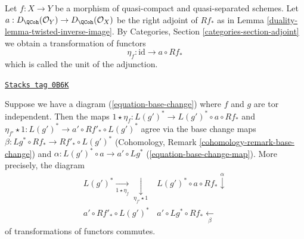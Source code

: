 Let $f : X \to Y$ be a morphism of quasi-compact and quasi-separated
schemes. Let $a : D_\QCoh(\mathcal{O}_Y) \to D_\QCoh(\mathcal{O}_X)$
be the right adjoint of $Rf_*$ as in
Lemma \ref{duality-lemma-twisted-inverse-image}. By
Categories, Section \ref{categories-section-adjoint} we obtain a
transformation of functors
$$
\eta_f : \text{id} \to  a \circ Rf_*
$$
which is called the unit of the adjunction.

\begin{lemma}
\label{duality-lemma-unit-and-base-change}
\href{https://stacks.math.columbia.edu/tag/0B6K}{\texttt{Stacks tag 0B6K}}

Suppose we have a diagram (\ref{equation-base-change}) where $f$ and $g$
are tor independent. Then the maps
$1 \star \eta_f : L(g')^* \to L(g')^* \circ a \circ Rf_*$ and
$\eta_{f'} \star 1 : L(g')^* \to a' \circ Rf'_* \circ L(g')^*$
agree via the base change maps
$\beta : Lg^* \circ Rf_* \to Rf'_* \circ L(g')^*$
(Cohomology, Remark \ref{cohomology-remark-base-change})
and $\alpha : L(g')^* \circ a \to a' \circ Lg^*$
(\ref{equation-base-change-map}).
More precisely, the diagram
$$
\begin{array}{cc}L(g')^* \underset{1 \star \eta_f}{\longrightarrow}\underset{\eta_{f'} \star 1}{\downarrow} & L(g')^* \circ a \circ Rf_* \overset{\alpha}{\downarrow} \\ a' \circ Rf'_* \circ L(g')^* & a' \circ Lg^* \circ Rf_* \underset{\beta}{\longleftarrow}\end{array}
$$
of transformations of functors commutes.
\end{lemma}

